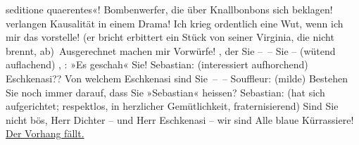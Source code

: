 \begin{ledgroupsized}[t]{13cm}
{               seditione quaerentes}{}\label{K_L01900_1h}«! Bombenwerfer, die über Knallbonbons sich beklagen!  verlangen Kausalität in einem Drama! Ich krieg
               ordentlich eine Wut, wenn ich mir das vorstelle! (er bricht erbittert ein Stück von
               seiner Virginia, die nicht brennt, ab) Ausgerechnet 
               machen mir Vorwürfe! {\pb}, der Sie – – Sie – (wütend auflachend) , : »Es geschah« Sie!\pend
           \pstart
           Sebastian: (interessiert aufhorchend) Eschkenasi?? Von welchem Eschkenasi sind
               Sie – –\pend
           \pstart
           Souffleur: (milde) Bestehen Sie noch immer darauf, dass Sie  »Sebastian« heissen?\pend
           \pstart
           Sebastian: (hat sich aufgerichtet; respektlos, in herzlicher Gemütlichkeit,
               fraternisierend) Sind Sie nicht bös, Herr Dichter – und Herr Eschkenasi – wir sind
               Alle blaue Kürrassiere!\pend
           \pstart
           \centering{}\uline{Der Vorhang fällt.}\pend
           
         
         \endnumbering{}\end{ledgroupsized}  \newcommand{\dateiname}{L01900}\newcommand{\titel}{Richard Beer-Hofmann an Arthur Schnitzler, [13. 12. 1909?]}\newcommand{\editorInnen}{Martin Anton Müller und Gerd-Hermann Susen}
      